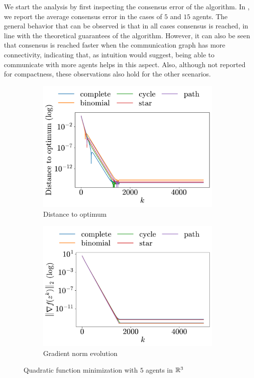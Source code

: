 \documentclass[a4paper,11pt,oneside]{book}
\begin{document}
We start the analysis by first inspecting the consensus error of the algorithm. In , we report the average consensus error in the cases of $5$ and $15$ agents. The general behavior that can be observed is that in all cases consensus is reached, in line with the theoretical guarantees of the algorithm. However, it can also be seen that consensus is reached faster when the communication graph has more connectivity, indicating that, as intuition would suggest, being able to communicate with more agents helps in this aspect. Also, although not reported for compactness, these observations also hold for the other scenarios.


\begin{figure}[h!]
      \centering
      \begin{subfigure}[h]{0.42\linewidth}
            \centering
            \includegraphics[width=\linewidth]{./figs/quadratic/5_3/distance.pdf} 
            \caption{Distance to optimum}
      \end{subfigure}
      \hfill
      \begin{subfigure}[h]{0.42\linewidth}
            \centering
            \includegraphics[width=\linewidth]{./figs/quadratic/5_3/gradient.pdf} 
            \caption{Gradient norm evolution}
      \end{subfigure}
      \caption{Quadratic function minimization with $5$ agents in ${\mathbb{R}}^{3}$}
      \label{fig:quadratic_5_3}
\end{figure}
\end{document}
